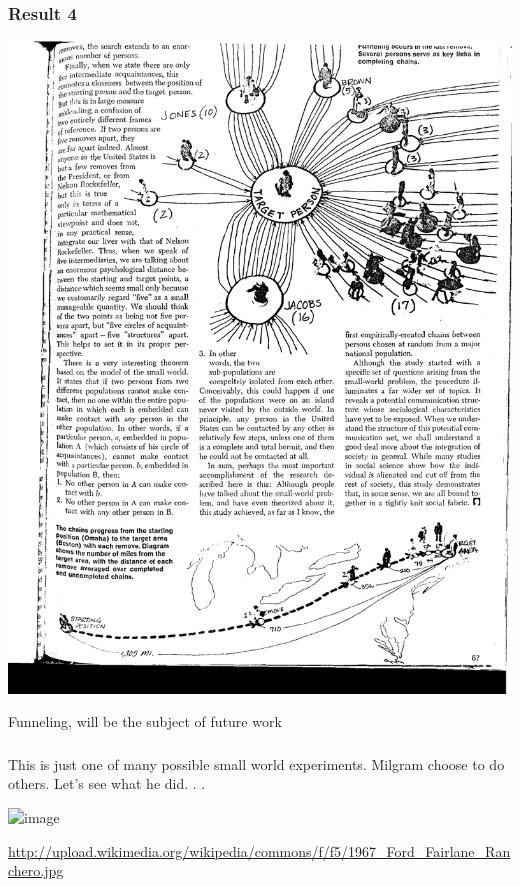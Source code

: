 \documentclass[aspectratio=169]{beamer}
\begin{document}
\begin{frame}
\frametitle{Result 4}

\begin{center}
\includegraphics[height=0.8\textheight]{figures/milgram_small-world_1967_funneling}
\end{center}

Funneling, will be the subject of future work

\end{frame}
\begin{frame}
\frametitle{}

This is just one of many possible small world experiments. Milgram choose to do others. Let's see what he did. . .

\end{frame}
\begin{frame}

\begin{center}
\includegraphics<1>[height=0.8\textheight]{figures/1967_Ford_Fairlane_Ranchero.jpg}
\end{center}

\vfill
\tiny{\url{http://upload.wikimedia.org/wikipedia/commons/f/f5/1967_Ford_Fairlane_Ranchero.jpg}}

\end{frame}
\end{document}
